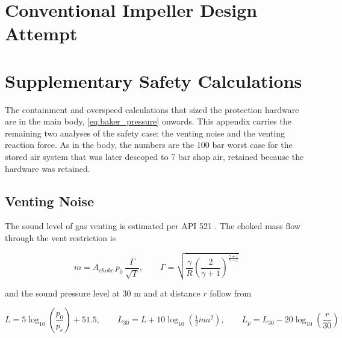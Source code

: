 \section{Conventional Impeller Design Attempt}
\label{sec:appendix_conventional}


\section{Supplementary Safety Calculations}
\label{sec:appendix_safety}

The containment and overspeed calculations that sized the protection hardware are in the main body, \cref{eq:baker_pressure} onwards. This appendix carries the remaining two analyses of the safety case: the venting noise and the venting reaction force. As in the body, the numbers are the 100 bar worst case for the stored air system that was later descoped to 7 bar shop air, retained because the hardware was retained.

\subsection{Venting Noise}

The sound level of gas venting is estimated per API 521 \cite{api521PressureRelieving}. The choked mass flow through the vent restriction is

\begin{equation}
    \dot{m} = A_{choke}\, p_0\, \frac{\Gamma}{\sqrt{T}}, \qquad
    \Gamma = \sqrt{\frac{\gamma}{R} \left( \frac{2}{\gamma + 1} \right)^{\frac{\gamma + 1}{\gamma - 1}}}
    \label{eq:choked_vent}
\end{equation}

and the sound pressure level at 30 m and at distance $r$ follow from

\begin{equation}
    L = 5\log_{10}\left(\frac{p_0}{p_e}\right) + 51.5, \qquad
    L_{30} = L + 10\log_{10}\left(\tfrac{1}{2}\dot{m} a^2\right), \qquad
    L_p = L_{30} - 20\log_{10}\left(\frac{r}{30}\right)
    \label{eq:api521_noise}
\end{equation}

